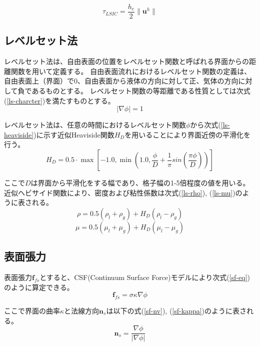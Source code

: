\documentclass[8pt,a4paper]{article}
\newcommand{\bm}{\boldsymbol}
\begin{document}
\begin{equation}
\label{ls-tau_LSIC}
	\tau_{LSIC} = \frac{h_{e}}{2} \| \bm{u}^{h} \|
\end{equation}

\subsection{レベルセット法}
レベルセット法は、自由表面の位置をレベルセット関数と呼ばれる界面からの距離関数を用いて定義する。
自由表面流れにおけるレベルセット関数の定義は、自由表面上（界面）で0、自由表面から液体の方向に対して正、気体の方向に対して負であるものとする。
レベルセット関数の等距離である性質としては次式(\ref{ls-charcter})を満たすものとする。
\begin{equation}
\label{ls-charcter}
	| \nabla \phi | = 1
\end{equation}

レベルセット法は、任意の時間におけるレベルセット関数$\phi$から次式(\ref{ls-heaviside})に示す近似Heaviside関数$H_{D}$を用いることにより界面近傍の平滑化を行う。
\begin{equation}
\label{ls-heaviside}
	H_{D} = 0.5 \cdot \max \left[-1.0, \min \left(1.0, \frac{\phi}{D} + \frac{1}{\pi} sin\left(\frac{\pi \phi}{D}\right)\right) \right]
\end{equation}

ここで$D$は界面から平滑化をする幅であり、格子幅の1-5倍程度の値を用いる。
近似ヘビサイド関数により、密度および粘性係数は次式(\ref{ls-rho}), (\ref{ls-mu})のように表される。
\begin{equation}
\label{ls-rho}
	\rho = 0.5 (\rho_l + \rho_g) + H_{D} (\rho_l - \rho_g)
\end{equation}
\begin{equation}
\label{ls-mu}
	\mu = 0.5 (\mu_l + \mu_g) + H_{D} (\mu_l - \mu_g)
\end{equation}


\subsection{表面張力}
表面張力$\bm{f}_{fs}$とすると、CSF(Continuum Surface Force)モデルにより次式(\ref{sf-eq})のように算定できる。
\begin{equation}
\label{sf-eq}
	\bm{f}_{fs} = \sigma \kappa \nabla \phi
\end{equation}

ここで界面の曲率$\kappa$と法線方向$\bm{n}_{s}$は以下の式(\ref{sf-nv}), (\ref{sf-kappa})のように表される。
\begin{equation}
\label{sf-nv}
	\bm{n}_{s} = \frac{\nabla \phi}{| \nabla \phi |}
\end{equation}
\end{document}

